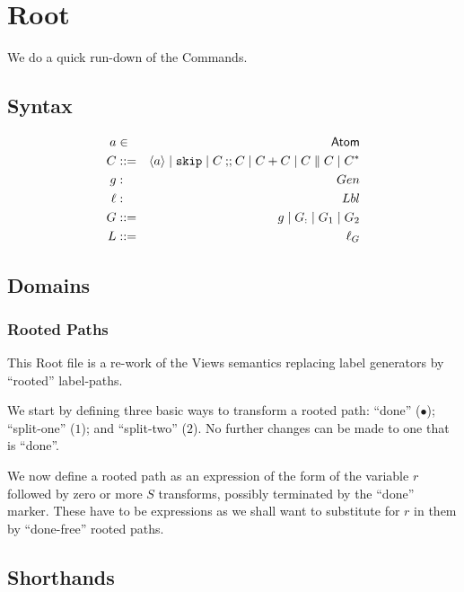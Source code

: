 \section{Root}\label{ha:Root}

We do a quick run-down of the Commands\cite{conf/popl/Dinsdale-YoungBGPY13}.

\subsection{Syntax}

\def\Atm#1{\langle#1\rangle}
\def\rr#1{r{\scriptstyle{#1}}}
\def\RR#1{R{\scriptstyle{#1}}}

\begin{eqnarray*}
   a &\in& \Atom
\\ C &::=&
 \Atm a \mid \cskip \mid C \cseq C \mid C+C \mid C \parallel C \mid C^*
\\ g &:& Gen
\\ \ell &:& Lbl
\\ G &::=&  g \mid G_{:} \mid G_1 \mid G_2
\\ L &::=& \ell_G
\end{eqnarray*}


\subsection{Domains}


\subsubsection{Rooted Paths}

This Root file is a re-work of the Views semantics
replacing label generators by ``rooted'' label-paths.

We start by defining three basic ways to transform a rooted path:
``done'' ($\bullet$);
``split-one'' ($1$);
and ``split-two'' ($2$).
No further changes can be made to one that is ``done''.

We now define a rooted path as an expression of the form
of the variable $r$ followed by zero or more $S$ transforms,
possibly terminated by the ``done'' marker.
These have to be expressions as we shall want to substitute for $r$
in them by ``done-free'' rooted paths.

\subsection{Shorthands}

